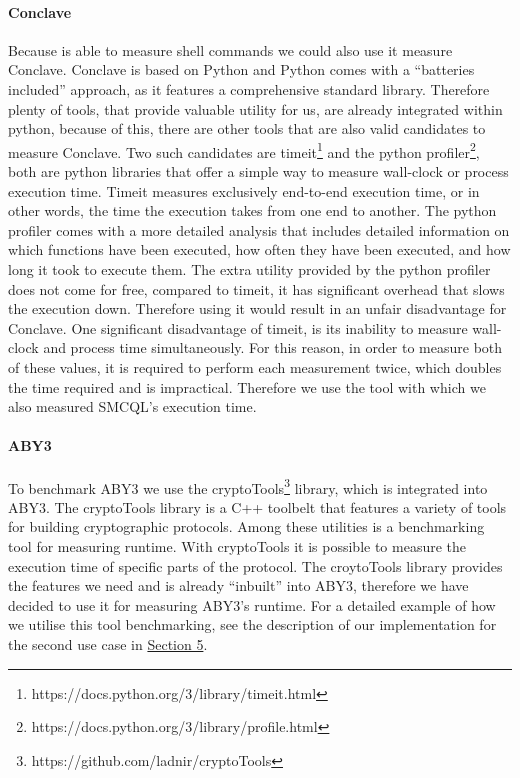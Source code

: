 \paragraph{Conclave}
Because  is able to measure shell commands we could also use it measure Conclave. Conclave is based on Python and Python comes with a ``batteries included'' approach, as it features a comprehensive standard library. Therefore plenty of tools, that provide valuable utility for us, are already integrated within python, because of this, there are other tools that are also valid candidates to measure Conclave. Two such candidates are timeit\footnote{https://docs.python.org/3/library/timeit.html} and the python profiler\footnote{https://docs.python.org/3/library/profile.html}, both are python libraries that offer a simple way to measure wall-clock or process execution time. Timeit measures exclusively end-to-end execution time, or in other words, the time the execution takes from one end to another. The python profiler comes with a more detailed analysis that includes detailed information on which functions have been executed, how often they have been executed, and how long it took to execute them. The extra utility provided by the python profiler does not come for free, compared to timeit, it has significant overhead that slows the execution down. Therefore using it would result in an unfair disadvantage for Conclave. One significant disadvantage of timeit, is its inability to measure wall-clock and process time simultaneously. For this reason, in order to measure both of these values, it is required to perform each measurement twice, which doubles the time required and is impractical. Therefore we use the  tool with which we also measured SMCQL's execution time.  



\paragraph{ABY3}
 To benchmark ABY3 we use the cryptoTools\footnote{https://github.com/ladnir/cryptoTools} library, which is integrated into ABY3. The cryptoTools library is a C++ toolbelt that features a variety of tools for building cryptographic protocols. Among these utilities is a benchmarking tool for measuring runtime. With cryptoTools it is possible to measure the execution time of specific parts of the protocol. The croytoTools library provides the features we need and is already ``inbuilt'' into ABY3, therefore we have decided to use it for measuring ABY3's runtime. For a detailed example of how we utilise this tool benchmarking, see the description of our implementation for the second use case in \hyperref[Implementation]{Section 5}.




